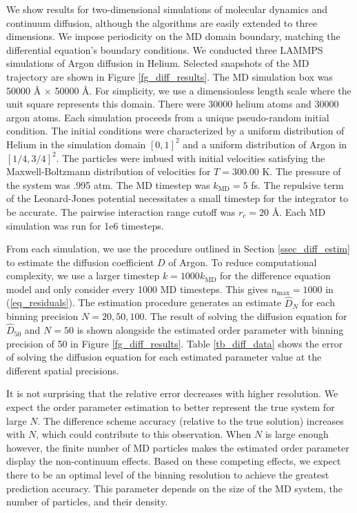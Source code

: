 \documentclass[12pt, reqno]{report}
\theoremstyle{definition}
\theoremstyle{remark}
\begin{document}
We show results for two-dimensional simulations of molecular dynamics and continuum diffusion, although the algorithms are easily extended to three dimensions.
We impose periodicity on the MD domain boundary, matching the differential equation's boundary conditions. 
We conducted three LAMMPS simulations of Argon diffusion in Helium. 
Selected snapshots of the MD trajectory are shown in Figure \ref{fg_diff_results}.
The MD simulation box was 50000 \r{A} $\times$ 50000 \r{A}.
For simplicity, we use a dimensionless length scale where the unit square represents this domain.
There were 30000 helium atoms and 30000 argon atoms.
Each simulation proceeds from a unique pseudo-random initial condition.
The initial conditions were characterized by a uniform distribution of Helium in the simulation domain $[0,1]^2$ and a uniform distribution of Argon in $[1/4,3/4]^2$.
The particles were imbued with initial velocities satisfying the Maxwell-Boltzmann distribution of velocities for $T=300.00$ K. 
The pressure of the system was .995 atm.
The MD timestep was $k_\text{MD}=5$ fs. 
The repulsive term of the Leonard-Jones potential necessitates a small timestep for the integrator to be accurate.
The pairwise interaction range cutoff was $r_c=20$ \r{A}.
Each MD simulation was run for 1e6 timesteps. 

From each simulation, we use the procedure outlined in Section \ref{ssec_diff_estim} to estimate the diffusion coefficient $D$ of Argon. 
To reduce computational complexity, we use a larger timestep $k=1000k_\text{MD}$ for the difference equation model and only consider every 1000 MD timesteps. 
This gives $n_\text{max}=1000$ in (\ref{eq_residuals}).
The estimation procedure generates an estimate $\hat D_N$ for each binning precision $N=20,50,100$.
The result of solving the diffusion equation for $\hat D_{50}$ and $N=50$ is shown alongside the estimated order parameter with binning precision of 50 in Figure \ref{fg_diff_results}.
Table \ref{tb_diff_data} shows the error of solving the diffusion equation for each estimated parameter value at the different spatial precisions.

It is not surprising that the relative error decreases with higher resolution.
We expect the order parameter estimation to better represent the true system for large $N$.
The difference scheme accuracy (relative to the true solution) increases with $N$, which could contribute to this observation.
When $N$ is large enough however, the finite number of MD particles makes the estimated order parameter display the non-continuum effects.
Based on these competing effects, we expect there to be an optimal level of the binning resolution to achieve the greatest prediction accuracy.
This parameter depends on the size of the MD system, the number of particles, and their density.
\end{document}
